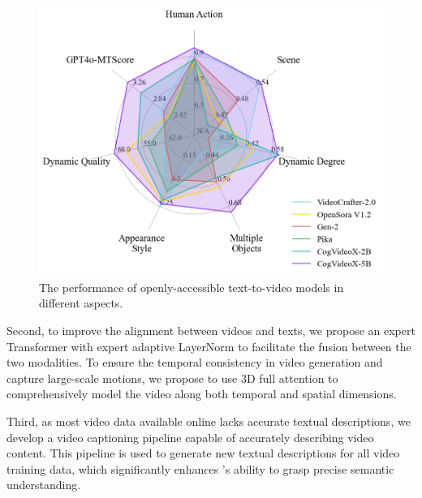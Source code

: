 \begin{figure}
\centering
\includegraphics[width=\linewidth]{images/bench_eval9.png}
\caption{The performance of openly-accessible text-to-video models in different aspects.}
\label{fig:radar}
\vspace{-6mm}
\end{figure}




Second, to improve the alignment between videos and texts, we propose an expert Transformer with expert adaptive LayerNorm to facilitate the fusion between the two modalities. 
To ensure the temporal consistency in video generation and  capture large-scale motions, we propose to use 3D full attention to comprehensively model the video along both temporal and spatial dimensions. 

Third, as most video data available online lacks accurate textual descriptions, we develop a video captioning pipeline capable of accurately describing video content. 
This pipeline is used to generate new textual descriptions for all video training data, which significantly enhances \model's ability to grasp precise semantic understanding. 

